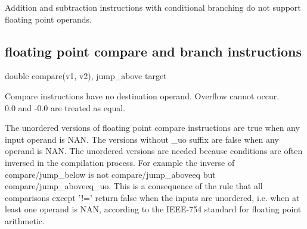 \documentclass[forwardcom.tex]{subfiles}
\begin{document}
Addition and subtraction instructions with conditional branching do not support floating point operands.
\vv


\subsection{floating point compare and branch instructions}
double compare(v1, v2), jump\_above target
\vv

Compare instructions have no destination operand. 
Overflow cannot occur. \\
0.0 and -0.0 are treated as equal.
\vv

The unordered versions of floating point compare instructions are true when any input operand is NAN. The versions without \_uo suffix are false when any operand is NAN. 
The unordered versions are needed because conditions are often inversed in the compilation process. For example the inverse of compare/jump\_below is not compare/jump\_aboveeq but compare/jump\_aboveeq\_uo. This is a consequence of the rule that  all comparisons except '!=' return false when the inputs are unordered, i.e. when at least one operand is NAN, according to the IEEE-754 standard for floating point arithmetic.
\vspace{4mm}
\end{document}
